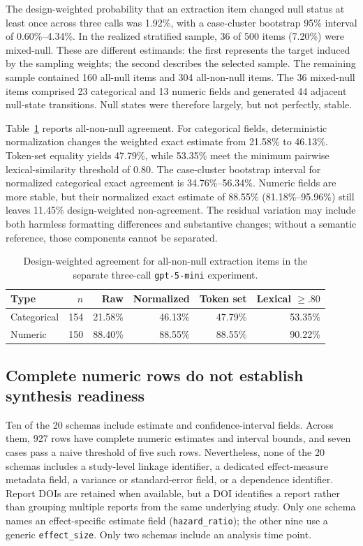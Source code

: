 \documentclass[acmsmall,anonymous,review]{acmart}
\begin{document}
The design-weighted probability that an extraction item changed null status at least once across three calls was 1.92\%, with a case-cluster bootstrap 95\% interval of 0.60\%--4.34\%. In the realized stratified sample, 36 of 500 items (7.20\%) were mixed-null. These are different estimands: the first represents the target induced by the sampling weights; the second describes the selected sample. The remaining sample contained 160 all-null items and 304 all-non-null items. The 36 mixed-null items comprised 23 categorical and 13 numeric fields and generated 44 adjacent null-state transitions. Null states were therefore largely, but not perfectly, stable.

Table~\ref{tab:repeatability} reports all-non-null agreement. For categorical fields, deterministic normalization changes the weighted exact estimate from 21.58\% to 46.13\%. Token-set equality yields 47.79\%, while 53.35\% meet the minimum pairwise lexical-similarity threshold of 0.80. The case-cluster bootstrap interval for normalized categorical exact agreement is 34.76\%--56.34\%. Numeric fields are more stable, but their normalized exact estimate of 88.55\% (81.18\%--95.96\%) still leaves 11.45\% design-weighted non-agreement. The residual variation may include both harmless formatting differences and substantive changes; without a semantic reference, those components cannot be separated.

\begin{table}[t]
\caption{Design-weighted agreement for all-non-null extraction items in the separate three-call \texttt{gpt-5-mini} experiment.}
\label{tab:repeatability}
\small
\begin{tabular}{lrrrrr}
\toprule
\textbf{Type} & \textbf{$n$} & \textbf{Raw} & \textbf{Normalized} & \textbf{Token set} & \textbf{Lexical $\geq .80$} \\
\midrule
Categorical & 154 & 21.58\% & 46.13\% & 47.79\% & 53.35\% \\
Numeric & 150 & 88.40\% & 88.55\% & 88.55\% & 90.22\% \\
\bottomrule
\end{tabular}
\end{table}

\subsection{Complete numeric rows do not establish synthesis readiness}

Ten of the 20 schemas include estimate and confidence-interval fields. Across them, 927 rows have complete numeric estimates and interval bounds, and seven cases pass a naive threshold of five such rows. Nevertheless, none of the 20 schemas includes a study-level linkage identifier, a dedicated effect-measure metadata field, a variance or standard-error field, or a dependence identifier. Report DOIs are retained when available, but a DOI identifies a report rather than grouping multiple reports from the same underlying study. Only one schema names an effect-specific estimate field (\texttt{hazard\_ratio}); the other nine use a generic \texttt{effect\_size}. Only two schemas include an analysis time point.
\end{document}
